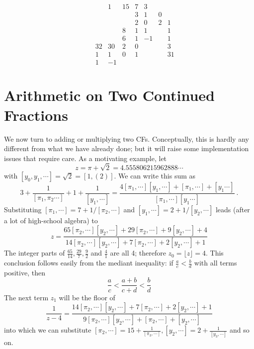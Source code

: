 \documentclass[11pt, oneside]{amsart}   	%
\renewcommand{\:}{\negthickspace:\negthickspace}
\begin{document}
\begin{equation*}\label{eq:2dgrid}
\begin{matrix}
 & & & 1& 15&       7&  3& &\\
 & & &  &        &     3&   1& 0&\\
 & & &  &        &     2&    0& 2& 1\\
 & & &  &        8&   1&    1&   &  1\\
 & & &  &        6&   1&    -1&  & 1\\
 & & 32& 30&  2& 0&        &  &  3\\
 & &  1&   1&  0&  1&        &  & 31\\
 & &   1&  -1&   &    &        &  &
\end{matrix}
\end{equation*}


\section{Arithmetic on Two Continued Fractions}
We now turn to adding or multiplying two CFs. Conceptually, this is hardly any different from what we have already done;
but it will raise some implementation issues that require care. As a motivating example, let
\[
z = \pi + \sqrt{2} = 4.555806215962888\cdots
\]
 with $[y_0, y_1,\cdots] = \sqrt{2} = [1,(2)]$. We can write this sum as
\begin{equation*}
3 + \frac{1}{[\pi_1,\pi_2\cdots]} + 1 + \frac{1}{[y_1,\cdots]} = \frac{ 4[\pi_1,\cdots][y_1,\cdots] + [\pi_1,\cdots]  + [y_1\cdots]}{ [\pi_1,\cdots][y_1\cdots] }\ .
\end{equation*}
Substituting $[\pi_1,\cdots] = 7 + 1/[\pi_2,\cdots]$ and $[y_1,\cdots] = 2 + 1/[y_2,\cdots]$ leads (after a lot of high-school algebra) to 
\begin{equation*}
z = \frac{65[\pi_2,\cdots] [y_2,\cdots] + 29[\pi_2,\cdots] +9[y_2,\cdots] +4}{14[\pi_2,\cdots] [y_2,\cdots] + 7[\pi_2,\cdots] +2[y_2,\cdots] +1}
\end{equation*}
The integer parts of $\frac{65}{14}, \frac{29}{7}, \frac{9}{2}$ and  $\frac{4}{1}$ are all 4; therefore $z_0 = \lfloor z \rfloor =4$.
This conclusion follows easily from the mediant inequality: if $\frac{a}{c} < \frac{b}{d}$ with all terms positive, then
\[
\frac{a}{c} < \frac{a+b}{c+d}< \frac{b}{d}
\] 
The next term $z_1$ will be the floor of
\begin{equation*}
\frac{1}{z-4} =  \frac{14[\pi_2,\cdots] [y_2,\cdots] + 7[\pi_2,\cdots] +2[y_2,\cdots] +1}{9[\pi_2,\cdots] [y_2,\cdots] + [\pi_2,\cdots] +[y_2,\cdots]}
\end{equation*}
into which we can substitute  $[\pi_2,\cdots]=15+\frac{1}{[\pi_3,\cdots]},  [y_2,\cdots]=2+\frac{1}{[y_3,\cdots]}$ and so on.
\end{document}
